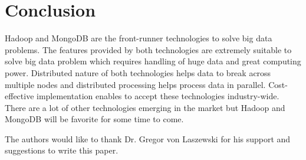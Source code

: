 \documentclass[sigconf]{acmart}
\begin{document}
\section{Conclusion}
Hadoop and MongoDB are the front-runner technologies to solve big data problems. The features provided by both technologies are extremely suitable to solve big data problem which requires handling of huge data and great computing power. Distributed nature of both technologies helps data to break across multiple nodes and distributed processing helps process data in parallel. Cost-effective implementation enables to accept these technologies industry-wide. There are a lot of other technologies emerging in the market but Hadoop and MongoDB will be favorite for some time to come.

\begin{acks}

  The authors would like to thank Dr. Gregor von Laszewski for his
  support and suggestions to write this paper.

\end{acks}


 

\appendix


\end{document}
